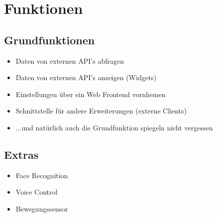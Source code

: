 
\section{Funktionen}\label{Funktionen}
\subsection{Grundfunktionen}
\begin{itemize}
\item Daten von externen API's abfragen
\item Daten von externen API's anzeigen (Widgets)
\item Einstellungen über ein Web Frontend vornhemen
\item Schnittstelle für andere Erweiterungen (externe Clients)
\item ...und natürlich auch die Grundfunktion spiegeln nicht vergessen
\end{itemize}

%
\subsection{Extras}
\begin{itemize}
\item Face Recognition
\item Voice Control
\item Bewegungssensor
\end{itemize}
